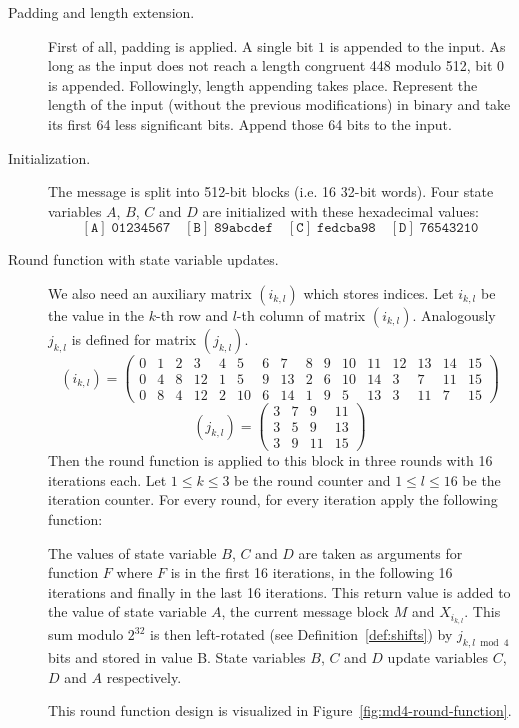 \begin{description}
  \item[Padding and length extension.]
    First of all, padding is applied. A single bit $1$ is appended to the
    input. As long as the input does not reach a length congruent 448 modulo 512,
    bit $0$ is appended.
    Followingly, length appending takes place. Represent the length of the input
    (without the previous modifications) in binary and take its first
    64 less significant bits. Append those 64 bits to the input.
  \item[Initialization.]
    The message is split into 512-bit blocks (i.e. 16 32-bit words).
    Four state variables $A$, $B$, $C$ and $D$ are initialized with these
    hexadecimal values:
    \[
      \mathtt{[A]}\; \texttt{01234567} \quad
      \mathtt{[B]}\; \texttt{89abcdef} \quad
      \mathtt{[C]}\; \texttt{fedcba98} \quad
      \mathtt{[D]}\; \texttt{76543210}
    \]
  \item[Round function with state variable updates.]
    We also need an auxiliary matrix $(i_{k,l})$ which stores indices.
    Let $i_{k,l}$ be the value in the $k$-th row and $l$-th column of matrix $(i_{k,l})$.
    Analogously $j_{k,l}$ is defined for matrix $(j_{k,l})$.
    \[
      (i_{k,l}) = \left(\begin{array}{cccccccccccccccc}
        0 & 1 & 2 & 3 & 4 & 5 & 6 & 7 & 8 & 9 & 10 & 11 & 12 & 13 & 14 & 15 \\
        0 & 4 & 8 & 12 & 1 & 5 & 9 & 13 & 2 & 6 & 10 & 14 & 3 & 7 & 11 & 15 \\
        0 & 8 & 4 & 12 & 2 & 10 & 6 & 14 & 1 & 9 & 5 & 13 & 3 & 11 & 7 & 15
      \end{array}\right)
    \] \[
      (j_{k,l}) = \begin{pmatrix}
        3 & 7 & 9 & 11 \\
        3 & 5 & 9 & 13 \\
        3 & 9 & 11 & 15
      \end{pmatrix}
    \]
    Then the round function is applied to this block in three rounds
    with 16 iterations each. Let $1 \leq k \leq 3$ be the round counter
    and $1 \leq l \leq 16$ be the iteration counter. For every round,
    for every iteration apply the following function:

    The values of state variable $B$, $C$ and $D$ are taken as arguments
    for function $F$ where $F$ is  in the first 16 iterations,
     in the following 16 iterations and finally 
    in the last 16 iterations. This return value is added to the value of state
    variable $A$, the current message block $M$ and $X_{i_{k,l}}$.
    This sum modulo $2^{32}$ is then left-rotated (see Definition~\ref{def:shifts}) by
    $j_{k,l \bmod{4}}$ bits and stored in value B. State variables $B$, $C$ and
    $D$ update variables $C$, $D$ and $A$ respectively.

    This round function design is visualized in Figure~\ref{fig:md4-round-function}.
\end{description}

